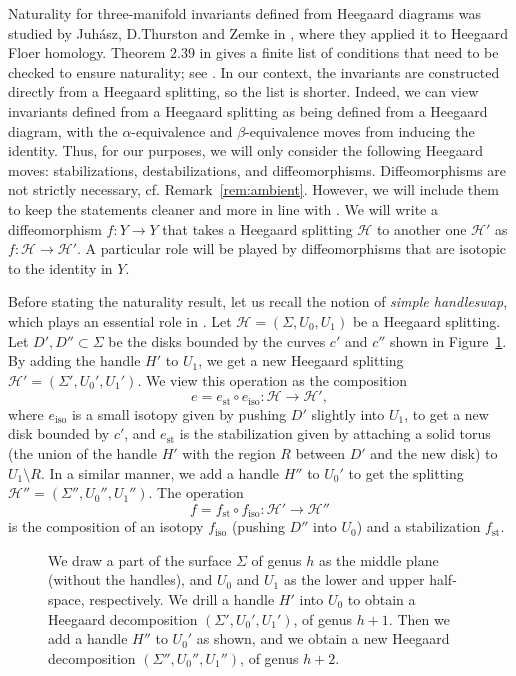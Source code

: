 \documentclass [11pt]{amsart}
\theoremstyle{remark}
\def\st{\operatorname{st}}
\def\iso{\operatorname{iso}}
\def\cH{\mathcal{H}}
\begin{document}
Naturality for three-manifold invariants defined from Heegaard diagrams was studied by Juh\'asz, D.Thurston and Zemke in \cite{JuhaszThurston}, where they applied it to Heegaard Floer homology. Theorem 2.39 in \cite{JuhaszThurston} gives a finite list of conditions that need to be checked to ensure naturality; see \cite[Definitions 2.30 and 2.33]{JuhaszThurston}. In our context, the invariants are constructed directly from a Heegaard splitting, so the list is shorter. Indeed, we can view invariants defined from a Heegaard splitting as being defined from a Heegaard diagram, with the $\alpha$-equivalence and $\beta$-equivalence moves from \cite{JuhaszThurston} inducing the identity. Thus, for our purposes, we will only consider the following Heegaard moves: stabilizations, destabilizations, and diffeomorphisms. Diffeomorphisms are not strictly necessary, cf. Remark~\ref{rem:ambient}. However, we will include them to keep the statements cleaner and more in line with  \cite{JuhaszThurston}. We will write a diffeomorphism $f: Y \to Y$ that takes a Heegaard splitting $\cH$ to another one $\cH'$ as $f: \cH \to \cH'$. A particular role will be played by diffeomorphisms that are isotopic to the identity in $Y$.

Before stating the naturality result, let us recall the notion of {\em simple handleswap}, which plays an essential role in \cite{JuhaszThurston}. Let $\cH=(\Sigma, U_0, U_1)$ be a Heegaard splitting. Let $D', D'' \subset \Sigma$ be the disks bounded by the curves $c'$ and $c''$ shown in Figure~\ref{fig:handleswap}. By adding the handle $H'$ to $U_1$, we get a new Heegaard splitting $\cH'= (\Sigma', U_0', U_1')$. We view this operation as the composition
$$ e = e_{\st} \circ e_{\iso} : \cH \to \cH',$$
where $e_{\iso}$ is a small isotopy given by pushing $D'$ slightly into $U_1$, to get a new disk bounded by $c'$, and $e_{\st}$ is the stabilization given by attaching a solid torus (the union of the handle $H'$ with the region $R$ between $D'$ and the new disk) to $U_1 \setminus R$. In a similar manner, we add a handle $H''$ to $U_0'$ to get the splitting $\cH'' =(\Sigma'', U_0'', U_1'')$.  The operation
$$ f = f_{\st} \circ f_{\iso} : \cH' \to \cH''$$
is the composition of an isotopy $f_{\iso}$ (pushing $D''$ into $U_0$) and a stabilization $f_{\st}$.

\begin {figure}
\begin {center}

\caption {We draw a part of the surface $\Sigma$ of genus $h$ as the middle plane (without the handles), and $U_0$ and $U_1$ as the lower and upper half-space, respectively. We drill a handle $H'$ into $U_0$ to obtain a Heegaard decomposition $(\Sigma', U_0', U_1')$, of genus $h+1$. Then we add a handle $H''$ to $U_0'$ as shown, and we obtain a new Heegaard decomposition $(\Sigma'', U_0'', U_1'')$, of genus $h+2$. }
\label{fig:handleswap}
\end {center}
\end {figure}
\end{document}
